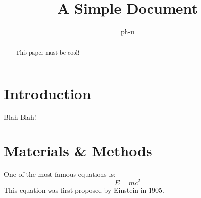 \documentclass[12pt]{article}
\title{A Simple Document}
\author{ph-u}
\date{}
\begin{document}
	\maketitle
	\begin{abstract}
		This paper must be cool!
	\end{abstract}
	\section{Introduction}
		Blah Blah!
	\section{Materials \& Methods}
	One of the most famous equations is:
	\begin{equation}
		E = mc^2
	\end{equation}
	This equation was first proposed by Einstein in 1905\cite{einstein1905does}.

	
	
\end{document}
